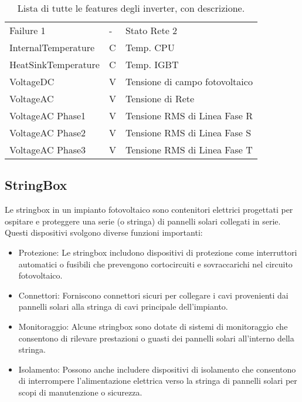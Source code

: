 \begin{table}[H]
\begin{center}
\begin{tabular}[c]{l|l|l}
			Failure 1                                 & -   & Stato Rete 2                   \\
			InternalTemperature                       & C   & Temp. CPU                      \\
			HeatSinkTemperature                       & C   & Temp. IGBT                     \\
			VoltageDC                                 & V   & Tensione di campo fotovoltaico \\
			VoltageAC                                 & V   & Tensione di Rete               \\
			VoltageAC Phase1                          & V   & Tensione RMS di Linea Fase R   \\
			VoltageAC Phase2                          & V   & Tensione RMS di Linea Fase S   \\
			VoltageAC Phase3                          & V   & Tensione RMS di Linea Fase T   \\
			\hline
		\end{tabular}
		\caption{Lista di tutte le features degli inverter, con descrizione.}\label{tab:invfeatures}
	\end{center}
\end{table}


\subsection{StringBox}
Le stringbox in un impianto fotovoltaico sono contenitori elettrici progettati
per ospitare e proteggere una serie (o stringa) di pannelli solari collegati in
serie. Questi dispositivi svolgono diverse funzioni importanti:

\begin{itemize}
	\item Protezione: Le stringbox includono dispositivi di protezione come interruttori
	      automatici o fusibili che prevengono cortocircuiti e sovraccarichi nel circuito
	      fotovoltaico.
	\item Connettori: Forniscono connettori sicuri per collegare i cavi provenienti dai
	      pannelli solari alla stringa di cavi principale dell'impianto.
	\item Monitoraggio: Alcune stringbox sono dotate di sistemi di monitoraggio che
	      consentono di rilevare prestazioni o guasti dei pannelli solari all'interno
	      della stringa.
	\item Isolamento: Possono anche includere dispositivi di isolamento che consentono di
	      interrompere l'alimentazione elettrica verso la stringa di pannelli solari per
	      scopi di manutenzione o sicurezza.
\end{itemize}

